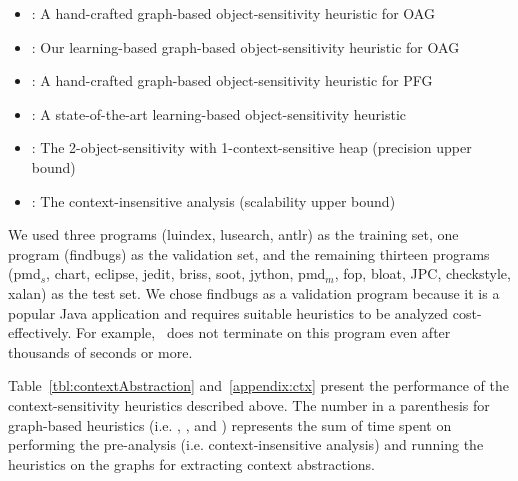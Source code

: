 \begin{itemize}
\item \Scaler: A hand-crafted graph-based object-sensitivity heuristic for OAG~\cite{Li2018b}
\item \OurCtx: Our learning-based graph-based object-sensitivity heuristic for OAG
\item \Zipper: A hand-crafted graph-based object-sensitivity heuristic for PFG~\cite{Li2018a}
\item \Data: A state-of-the-art learning-based object-sensitivity heuristic~\cite{JeJeChOh17}
\item \twoobjH: The 2-object-sensitivity with 1-context-sensitive heap (precision upper bound)
\item \Insens: The context-insensitive analysis (scalability upper bound)
\end{itemize}


We used three programs (luindex, lusearch, antlr) as the training set, one program (findbugs) as the validation set,
and the remaining thirteen programs (pmd$_{s}$, chart, eclipse, jedit, briss, soot, jython, pmd$_{m}$, fop, bloat, JPC, checkstyle, xalan) as the test set.
We chose findbugs as a validation program because it is a popular Java application and
requires suitable heuristics to be analyzed cost-effectively.
For example, \twoobjH~does not terminate on this program even after thousands of seconds or more.






Table~\ref{tbl:contextAbstraction} and~\ref{appendix:ctx} present the performance of the context-sensitivity heuristics described above.
The number in a parenthesis for graph-based heuristics (i.e. \OurCtx, \Zipper, and \Scaler)
represents the sum of time spent on performing the pre-analysis (i.e. context-insensitive analysis) and running the heuristics on the graphs for extracting context abstractions.


